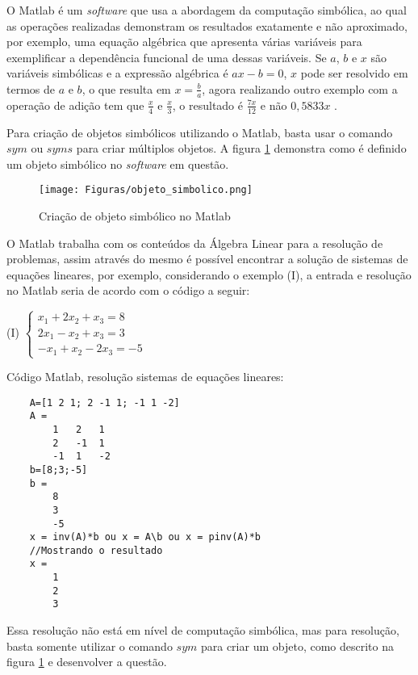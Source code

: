 O Matlab é um \textit{software} que usa a abordagem da computação simbólica, ao qual as operações realizadas demonstram os resultados exatamente e não aproximado, por exemplo, uma equação algébrica que apresenta várias variáveis para exemplificar a dependência funcional de uma dessas variáveis. Se $a$, $b$ e $x$ são variáveis simbólicas e a expressão algébrica é $ax-b = 0$, $x$ pode ser resolvido em termos de $a$ e $b$, o que resulta em $x = \frac{b}{a}$, agora realizando outro exemplo com a operação de adição tem que $\frac{x}{4}$ e $\frac{x}{3}$, o resultado é $\frac{7x}{12}$ e não $0,5833x$ \cite{2012:Amos}.

Para criação de objetos simbólicos utilizando o Matlab, basta usar o comando $sym$ ou $syms$ para criar múltiplos objetos. A figura \ref{objeto_simbolico} demonstra como é definido um objeto simbólico no \textit{software} em questão.

\begin{figure}[!htb]
  \centering 
  \texttt{[image: Figuras/objeto\_simbolico.png]}
  \caption{Criação de objeto simbólico no Matlab \cite{2012:Amos}}
  \label{objeto_simbolico}
\end{figure}

O Matlab trabalha com os conteúdos da Álgebra Linear para a resolução de problemas, assim através do mesmo é possível encontrar a solução de sistemas de equações lineares, por exemplo, considerando o exemplo (I), a entrada e resolução no Matlab seria de acordo com o código a seguir:

\begin{center}
(I)
    $\left\{\begin{matrix}
        x_{1} + 2x_{2} + x_{3} = 8 \\ 
        2x_{1} - x_{2} + x_{3} = 3 \\ 
        -x_{1} + x_{2} - 2x_{3} = -5  
    \end{matrix}\right.$
    \label{equacao}
\end{center}

Código Matlab, resolução sistemas de equações lineares:

\begin{lstlisting}
    A=[1 2 1; 2 -1 1; -1 1 -2]
    A =
        1   2   1
        2   -1  1
        -1  1   -2
    b=[8;3;-5]
    b =
        8
        3
        -5
    x = inv(A)*b ou x = A\b ou x = pinv(A)*b
    //Mostrando o resultado
    x =
        1
        2
        3
\end{lstlisting}

Essa resolução não está em nível de computação simbólica, mas para resolução, basta somente utilizar o comando $sym$ para criar um objeto, como descrito na figura \ref{objeto_simbolico} e desenvolver a questão.


